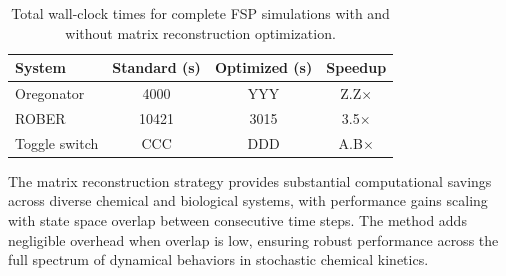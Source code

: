 \documentclass[final,supplement,onefignum,onetabnum]{siamart171218}
\begin{document}
\begin{table}[h]
\centering
\caption{Total wall-clock times for complete FSP simulations with and without matrix reconstruction optimization.}
\label{tab:walltime}
\begin{tabular}{lccc}
\hline
System & Standard (s) & Optimized (s) & Speedup \\
\hline
Oregonator & 4000 & YYY & Z.Z$\times$ \\
ROBER & 10421 & 3015 & 3.5$\times$ \\
Toggle switch & CCC & DDD & A.B$\times$ \\
\hline
\end{tabular}
\end{table}

The matrix reconstruction strategy provides substantial computational savings across diverse chemical and biological systems, with performance gains scaling with state space overlap between consecutive time steps. The method adds negligible overhead when overlap is low, ensuring robust performance across the full spectrum of dynamical behaviors in stochastic chemical kinetics.


\end{document}
